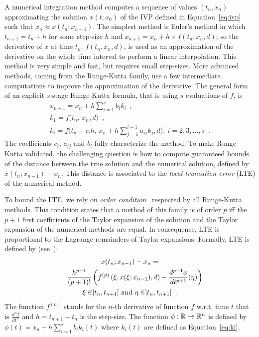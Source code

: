 A numerical integration method computes a sequence of values $(t_n,
x_n)$ approximating the solution $x(t;x_0)$ of the IVP defined in
Equation~\eqref{eq:ivp} such that $x_n \approx x(t_n;x_{n-1})$. The
simplest method is Euler's method in which $t_{n+1}=t_n+h$ for some
step-size $h$ and $x_{n+1}=x_n+h\times f(t_n,x_n, d)$; so the
derivative of $x$ at time $t_n$, $f(t_n,x_n, d)$, is used as an
approximation of the derivative on the whole time interval to perform
a linear interpolation. This method is very simple and fast, but
requires small step-sizes. More advanced methods, coming from the
Runge-Kutta family, use a few intermediate computations to improve the
approximation of the derivative. The general form of an explicit
$s$-stage Runge-Kutta formula, that is using $s$ evaluations of $f$,
is
\begin{equation}
  \begin{aligned}
    x_{n+1}  = x_n + h \sum_{i=1}^s b_i k_i\enspace, \\
    k_1  = f\big(t_n,\, x_n, d\big)\enspace,\\
    k_i  = f \Big(t_n + c_i h,\, x_n + h \sum_{j=1}^{i-1} a_{ij}k_j, d\Big)
    , \ i = 2,3,\dots,s\enspace.
    \label{eq:ki}
  \end{aligned}
\end{equation}
The coefficients $c_i$, $a_{ij}$ and $b_i$ fully characterize the
method. To make Runge-Kutta validated, the challenging question is how
to compute guaranteed bounds of the distance between the true solution
and the numerical solution, defined by $x(t_n;x_{n-1}) - x_n$. This
distance is associated to the \emph{local truncation error} (LTE) of
the numerical method.

To bound the LTE, we rely on \textit{order condition}~\cite{HNW93}
respected by all Runge-Kutta methods. This condition states that a
method of this family is of order $p$ iff the $p+1$ first coefficients
of the Taylor expansion of the solution and the Taylor expansion of
the numerical methods are equal. In consequence, LTE is proportional
to the Lagrange remainders of Taylor expansions.  Formally, LTE is
defined by (see~\cite{BCD13}):
\begin{multline}
  \label{eq:truncation-error}
  x(t_n;x_{n-1}) - x_n = \\
  \hspace{5mm}\frac{h^{p+1}}{(p+1)!} \left( f^{(p)}\left(\xi,x(\xi; x_{n-1}), d
    \right) - \frac{d^{p+1}\phi}{dt^{p+1}}(\eta) \right)
  \\
  \xi\in]t_n, t_{n+1}[ \text{ and } \eta\in]t_n, t_{n+1}[\enspace.
\end{multline}
The function $f^{(n)}$ stands for the $n$-th derivative of function
$f$ w.r.t. time $t$ that is $\frac{d^n f}{dt^n}$ and $h=t_{n+1}-t_n$
is the step-size.  The function $\phi:\mathbb{R}\to\mathbb{R}^n$ is defined by
$\phi(t)= x_n + h \sum_{i=1}^s b_i k_i(t)$ where $k_i(t)$ are defined
as Equation~\eqref{eq:ki}.

